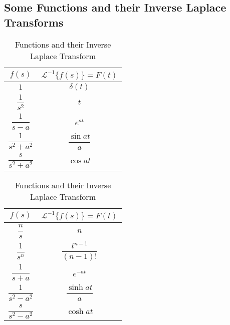 \documentclass[12pt]{article}
\newcommand{\Lap}{\mathscr{L}}
\begin{document}
\subsection{Some Functions and their Inverse Laplace Transforms}

\begin{table}[htpb]

    \centering
    \begin{tabular}{c|c}
        \hline
        $f(s)$ & $\Lap^{-1} \{ f(s) \} = F(t)$ \\
        \hline\hline
        $1$ & $\delta(t)$ \\
        \hline
        $\dfrac{1}{s^2}$ & $t$ \\
        \hline
        $\dfrac{1}{s-a}$ & $e^{at}$ \\
        \hline
        $\dfrac{1}{s^2+a^2}$ & $\dfrac{\sin{at}}{a}$ \\
        \hline
        $\dfrac{s}{s^2+a^2}$ & $\cos{at}$ \\
        \hline
    \end{tabular}
    \begin{tabular}{c | c}
        \hline
        $f(s)$ & $\Lap^{-1} \{ f(s) \} = F(t)$ \\
        \hline\hline
        $\dfrac{n}{s}$ & $n$ \\
        \hline
        $\dfrac{1}{s^n}$ & $\dfrac{t^{n-1}}{(n-1)!}$ \\
        \hline
        $\dfrac{1}{s+a}$ & $e^{-at}$ \\
        \hline
        $\dfrac{1}{s^2-a^2}$ & $\dfrac{\sinh{at}}{a}$ \\
        \hline
        $\dfrac{s}{s^2-a^2}$ & $\cosh{at}$ \\
        \hline
    \end{tabular}

    \caption{Functions and their Inverse Laplace Transform}
    \label{InvLapTable}
\end{table}
\end{document}
